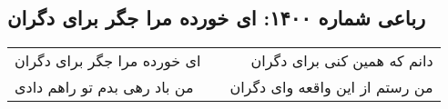 \begin{center}
\section*{رباعی شماره ۱۴۰۰: ای خورده مرا جگر برای دگران}
\label{sec:1400}
\begin{longtable}{l p{0.5cm} r}
ای خورده مرا جگر برای دگران
&&
دانم که همین کنی برای دگران
\\
من باد رهی بدم تو راهم دادی
&&
من رستم از این واقعه وای دگران
\\
\end{longtable}
\end{center}
